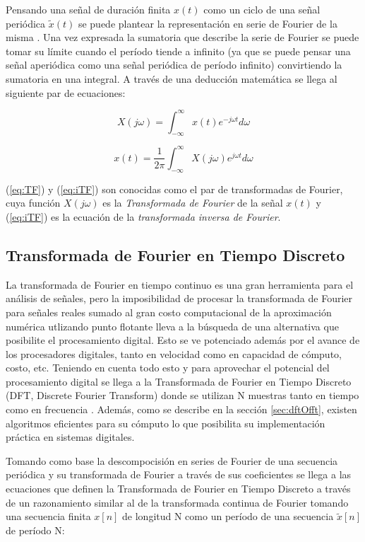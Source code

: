 Pensando una señal de duración finita $x(t)$ como un ciclo de una señal
periódica $\tilde{x}(t)$ se puede plantear la representación en serie de
Fourier de la misma \cite{Schaffer2_3}. Una vez expresada la sumatoria que describe la serie de
Fourier se puede tomar su límite cuando el período tiende a
infinito (ya que se puede pensar una señal aperiódica como una señal periódica
de período infinito) convirtiendo la sumatoria en una integral. A
través de una deducción matemática \cite{Schaffer2_3} se llega al siguiente par de ecuaciones:

\begin{equation}
X(j\omega) = \int_{-\infty}^{\infty}x(t)e^{-j\omega t}d\omega
\label{eq:TF}
\end{equation}

\begin{equation}
x(t) = \frac{1}{2\pi}\int_{-\infty}^{\infty}X(j\omega)e^{j\omega t}d\omega
\label{eq:iTF}
\end{equation}


(\ref{eq:TF}) y (\ref{eq:iTF}) son conocidas como el par de
transformadas de Fourier, cuya función $X(j\omega)$ es la \emph{Transformada de
Fourier} de la señal $x(t)$ y (\ref{eq:iTF}) es la ecuación de
la \emph{transformada inversa de Fourier}.

\subsection{Transformada de Fourier en Tiempo Discreto}

La transformada de Fourier en tiempo continuo es una gran herramienta
para el análisis de señales, pero la imposibilidad de procesar la transformada de Fourier para
señales reales sumado al gran costo computacional de la aproximación numérica utlizando punto
flotante lleva a la búsqueda de una alternativa que posibilite el procesamiento digital. Esto se ve
potenciado además por el avance de los procesadores digitales, tanto en velocidad como en capacidad
de cómputo, costo, etc. Teniendo en cuenta todo esto y para aprovechar el potencial del
procesamiento digital se llega a la Transformada de Fourier en Tiempo Discreto (DFT, Discrete Fourier Transform)
donde se utilizan N muestras tanto en tiempo como en frecuencia \cite{Schaffer2_3}.
Además, como se describe en la sección \ref{sec:dftOfft}, existen algoritmos eficientes para su
cómputo lo que posibilita su implementación práctica en sistemas digitales.

Tomando como base la descompocisión en series de Fourier de una secuencia
periódica y su transformada de Fourier a través de sus coeficientes se
llega a las ecuaciones que definen la Transformada de Fourier en Tiempo
Discreto a través de un razonamiento similar al de la transformada continua de
Fourier tomando una secuencia finita $x[n]$ de longitud N como un período de una
secuencia $\tilde{x}[n]$ de período N:

